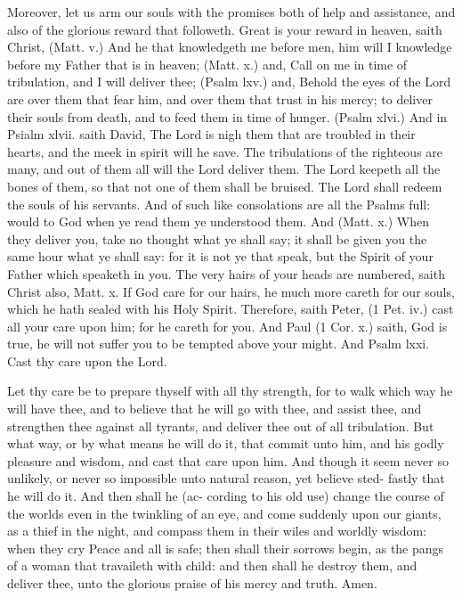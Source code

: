 \documentclass{custom}
\begin{document}
Moreover, let us arm our souls with the 
promises both of help and assistance, and also of 
the glorious reward that followeth. Great is 
your reward in heaven, saith Christ, (Matt. v.) 
And he that knowledgeth me before men, him
will I knowledge before my Father that is in 
heaven; (Matt. x.) and, Call on me in time of
tribulation, and I will deliver thee; (Psalm lxv.)
and, Behold the eyes of the Lord are over them 
that fear him, and over them that trust in his 
mercy; to deliver their souls from death, and to 
feed them in time of hunger. (Psalm xlvi.) And 
in Psialm xlvii. saith David, The Lord is nigh 
them that are troubled in their hearts, and the 
meek in spirit will he save. The tribulations of 
the righteous are many, and out of them all will 
the Lord deliver them. The Lord keepeth all 
the bones of them, so that not one of them shall be 
bruised. The Lord shall redeem the souls of 
his servants. And of such like consolations are 
all the Psalms full: would to God when ye read 
them ye understood them. And (Matt. x.) When 
they deliver you, take no thought what ye shall 
say; it shall be given you the same hour what ye 
shall say: for it is not ye that speak, but the 
Spirit of your Father which speaketh in you. The 
very hairs of your heads are numbered, saith 
Christ also, Matt. x. If God care for our hairs, 
he much more careth for our souls, which he hath 
sealed with his Holy Spirit. Therefore, saith 
Peter, (1 Pet. iv.) cast all your care upon him;
for he careth for you. And Paul (1 Cor. x.)
saith, God is true, he will not suffer you to be
tempted above your might. And Psalm lxxi.
Cast thy care upon the Lord. 

Let thy care be to prepare thyself with all thy
strength, for to walk which way he will have
thee, and to believe that he will go with thee, 
and assist thee, and strengthen thee against all 
tyrants, and deliver thee out of all tribulation. 
But what way, or by what means he will do 
it, that commit unto him, and his godly pleasure 
and wisdom, and cast that care upon him. And 
though it seem never so unlikely, or never so 
impossible unto natural reason, yet believe sted- 
fastly that he will do it. And then shall he (ac- 
cording to his old use) change the course of the 
worlds even in the twinkling of an eye, and come 
suddenly upon our giants, as a thief in the 
night, and compass them in their wiles and 
worldly wisdom: when they cry Peace and all is 
safe; then shall their sorrows begin, as the 
pangs of a woman that travaileth with child:
and then shall he destroy them, and deliver thee, 
unto the glorious praise of his mercy and truth. 
Amen. 
\end{document}
